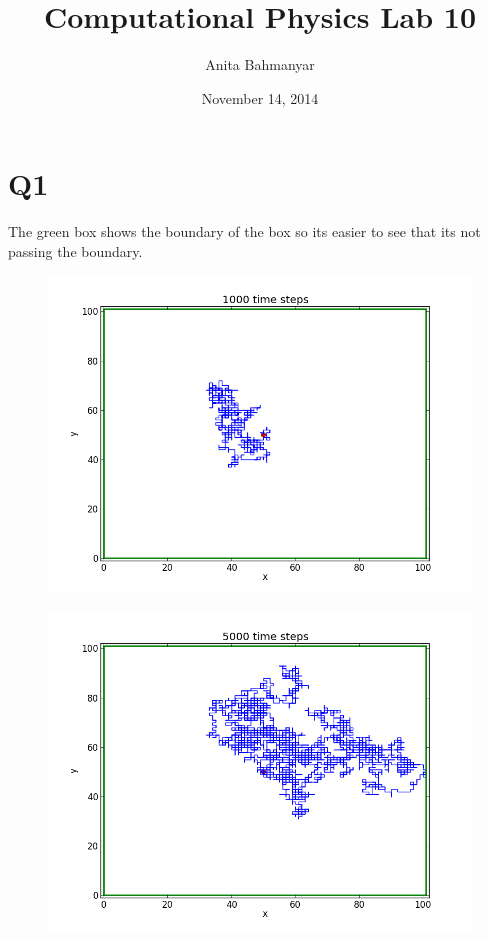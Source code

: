 \documentclass[letterpaper,12pt]{article}
\title{Computational Physics Lab 10}
\author{Anita Bahmanyar}
\affil{\small {Student Number: 998909098}}
\date{November 14, 2014}
\begin{document}
\maketitle

\section*{Q1}
The green box shows the boundary of the box so its easier to see that its not passing the boundary.

\FloatBarrier
\begin{figure}[H]
\centering
\includegraphics[scale=0.55]{q1a.png}
\caption{}
\end{figure}
\FloatBarrier

\FloatBarrier
\begin{figure}[H]
\centering
\includegraphics[scale=0.55]{q1b.png}
\caption{}
\end{figure}
\FloatBarrier
\end{document}
